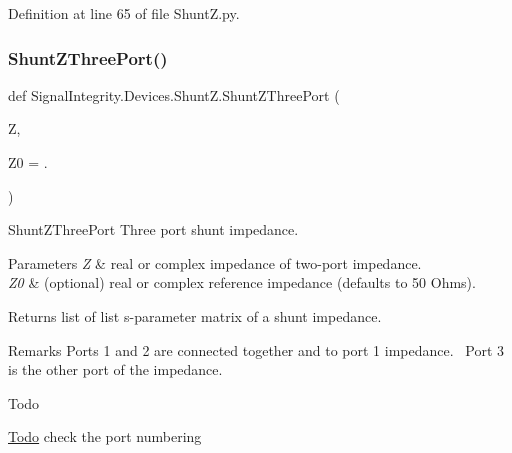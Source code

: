 Definition at line 65 of file Shunt\+Z.\+py.

\mbox{\label{namespaceSignalIntegrity_1_1Devices_1_1ShuntZ_a4f6b7665037fa8b00407684e513e7e37}} 
\subsubsection{\texorpdfstring{Shunt\+Z\+Three\+Port()}{ShuntZThreePort()}}
{\footnotesize\ttfamily def Signal\+Integrity.\+Devices.\+Shunt\+Z.\+Shunt\+Z\+Three\+Port (\begin{DoxyParamCaption}\item[{}]{Z,  }\item[{}]{Z0 = {.} }\end{DoxyParamCaption})}



Shunt\+Z\+Three\+Port Three port shunt impedance. 


\begin{DoxyParams}{Parameters}
{\em Z} & real or complex impedance of two-\/port impedance. \\
\hline
{\em Z0} & (optional) real or complex reference impedance (defaults to 50 Ohms). \\
\hline
\end{DoxyParams}
\begin{DoxyReturn}{Returns}
list of list s-\/parameter matrix of a shunt impedance.~\newline
 
\end{DoxyReturn}
\begin{DoxyRemark}{Remarks}
Ports 1 and 2 are connected together and to port 1 impedance.~\newline
 Port 3 is the other port of the impedance.~\newline

\end{DoxyRemark}
\begin{DoxyRefDesc}{Todo}
\item[\hyperlink{todo__todo000006}{Todo}]check the port numbering \end{DoxyRefDesc}


